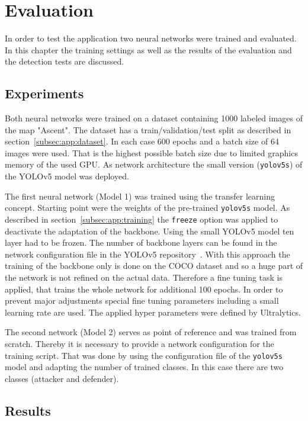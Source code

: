 \chapter{Evaluation}\label{chpt:evaluation}
\glsresetall

In order to test the application two neural networks were trained and evaluated. In this chapter the 
training settings as well as the results of the evaluation and the detection tests are discussed.

\section{Experiments}\label{sec:eval:experiments}

Both neural networks were trained on a dataset containing 1000 labeled images of the map 
"Ascent". The dataset has a train/validation/test split as described in 
section~\ref{subsec:app:dataset}. In each case 600 epochs and a batch size of 64 images were 
used. That is the highest possible batch size due to limited graphics memory of the used GPU. As 
network architecture the small version (\texttt{yolov5s}) of the YOLOv5 model was deployed.

The first neural network (Model 1) was trained using the transfer learning concept. Starting 
point were the weights of the pre-trained \texttt{yolov5s} model. As described in 
section~\ref{subsec:app:training} the \texttt{freeze} option was applied to deactivate the adaptation 
of the backbone. Using the small YOLOv5 model ten layer had to be frozen. The number of 
backbone layers can be found in the network configuration file in the YOLOv5 
repository~\cite{jocher2020}. With this approach the training of the backbone only is done on the 
COCO dataset and so a huge part of the network is not refined on the actual data. Therefore a fine 
tuning task is applied, that trains the whole network for additional 100 epochs. In order to prevent 
major adjustments special fine tuning parameters including a small learning rate are used. The 
applied hyper parameters were defined by Ultralytics.

The second network (Model 2) serves as point of reference and was trained from scratch. Thereby it 
is necessary to provide a network configuration for the training script. That was done by using the 
configuration file of the \texttt{yolov5s} model and adapting the number of trained classes. In this 
case there are two classes (attacker and defender).

\section{Results}\label{sec:eval:results}

